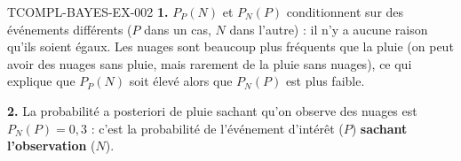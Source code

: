 \begin{corrige}{TCOMPL-BAYES-EX-002}
\textbf{1.} $P_P(N)$ et $P_N(P)$ conditionnent sur des événements différents ($P$ dans un cas, $N$ dans l'autre) : il n'y a aucune raison qu'ils soient égaux. Les nuages sont beaucoup plus fréquents que la pluie (on peut avoir des nuages sans pluie, mais rarement de la pluie sans nuages), ce qui explique que $P_P(N)$ soit élevé alors que $P_N(P)$ est plus faible.

\textbf{2.} La probabilité a posteriori de pluie sachant qu'on observe des nuages est $P_N(P) = 0{,}3$ : c'est la probabilité de l'événement d'intérêt ($P$) \textbf{sachant l'observation} ($N$).
\end{corrige}

